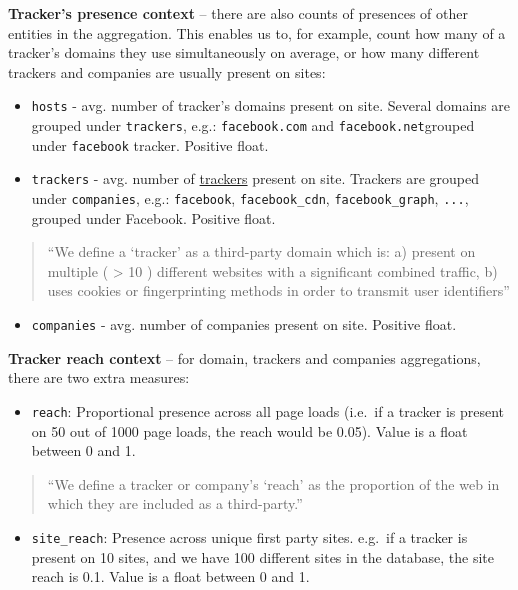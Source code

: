 \documentclass[
]{article}
\providecommand{\tightlist}{%
  \setlength{\itemsep}{0pt}\setlength{\parskip}{0pt}}
\begin{document}
\textbf{Tracker's presence context} -- there are also counts of
presences of other entities in the aggregation. This enables us to, for
example, count how many of a tracker's domains they use simultaneously
on average, or how many different trackers and companies are usually
present on sites:

\begin{itemize}
\item
  \texttt{hosts} - avg. number of tracker's domains present on site.
  Several domains are grouped under \texttt{trackers}, e.g.:
  \texttt{facebook.com} and \texttt{facebook.net}grouped under
  \texttt{facebook} tracker. Positive float.
\item
  \texttt{trackers} - avg. number of \href{https://t.ly/flZR}{trackers}
  present on site. Trackers are grouped under \texttt{companies}, e.g.:
  \texttt{facebook}, \texttt{facebook\_cdn}, \texttt{facebook\_graph},
  \texttt{...}, grouped under Facebook. Positive float.
\end{itemize}

\begin{quote}
``We define a `tracker' as a third-party domain which is: a) present on
multiple ( \textgreater{} 10 ) different websites with a significant
combined traffic, b) uses cookies or fingerprinting methods in order to
transmit user identifiers''
\end{quote}

\begin{itemize}
\tightlist
\item
  \texttt{companies} - avg. number of companies present on site.
  Positive float.
\end{itemize}

\textbf{Tracker reach context} -- for domain, trackers and companies
aggregations, there are two extra measures:

\begin{itemize}
\tightlist
\item
  \texttt{reach}: Proportional presence across all page loads (i.e.~if a
  tracker is present on 50 out of 1000 page loads, the reach would be
  0.05). Value is a float between 0 and 1.
\end{itemize}

\begin{quote}
``We define a tracker or company's `reach' as the proportion of the web
in which they are included as a third-party.''
\end{quote}

\begin{itemize}
\tightlist
\item
  \texttt{site\_reach}: Presence across unique first party sites.
  e.g.~if a tracker is present on 10 sites, and we have 100 different
  sites in the database, the site reach is 0.1. Value is a float between
  0 and 1.
\end{itemize}
\end{document}
